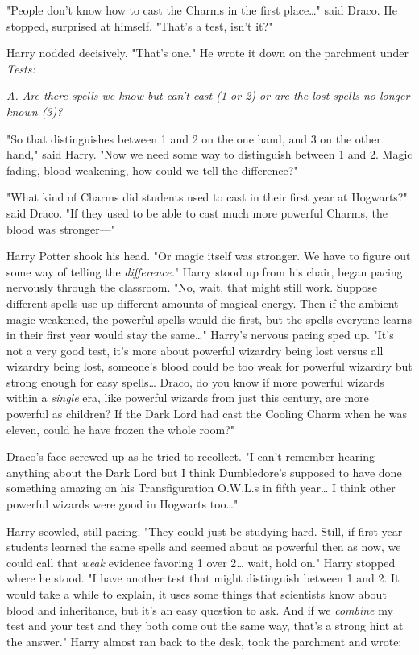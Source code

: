 "People don't know how to cast the Charms in the first place{\ldots}" said 
Draco. He stopped, surprised at himself. "That's a test, isn't it?"

Harry nodded decisively. "That's one." He wrote it down on the parchment under 
\emph{Tests:}

\emph{A. Are there spells we know but can't cast (1 or 2) or are the lost 
spells no longer known (3)?}

"So that distinguishes between 1 and 2 on the one hand, and 3 on the other 
hand," said Harry. "Now we need some way to distinguish between 1 and 2. Magic 
fading, blood weakening, how could we tell the difference?"

"What kind of Charms did students used to cast in their first year at 
Hogwarts?" said Draco. "If they used to be able to cast much more powerful 
Charms, the blood was stronger---"

Harry Potter shook his head. "Or magic itself was stronger. We have to figure 
out some way of telling the \emph{difference.}" Harry stood up from his chair, 
began pacing nervously through the classroom. "No, wait, that might still work. 
Suppose different spells use up different amounts of magical energy. Then if 
the ambient magic weakened, the powerful spells would die first, but the spells 
everyone learns in their first year would stay the same{\ldots}" Harry's 
nervous pacing sped up. "It's not a very good test, it's more about powerful 
wizardry being lost versus all wizardry being lost, someone's blood could be 
too weak for powerful wizardry but strong enough for easy spells{\ldots} Draco, 
do you know if more powerful wizards within a \emph{single} era, like powerful 
wizards from just this century, are more powerful as children? If the Dark Lord 
had cast the Cooling Charm when he was eleven, could he have frozen the whole 
room?"

Draco's face screwed up as he tried to recollect. "I can't remember hearing 
anything about the Dark Lord but I think Dumbledore's supposed to have done 
something amazing on his Transfiguration O.W.L.s in fifth year{\ldots} I think 
other powerful wizards were good in Hogwarts too{\ldots}"

Harry scowled, still pacing. "They could just be studying hard. Still, if 
first-year students learned the same spells and seemed about as powerful then 
as now, we could call that \emph{weak} evidence favoring 1 over 2{\ldots} wait, 
hold on." Harry stopped where he stood. "I have another test that might 
distinguish between 1 and 2. It would take a while to explain, it uses some 
things that scientists know about blood and inheritance, but it's an easy 
question to ask. And if we \emph{combine} my test and your test and they both 
come out the same way, that's a strong hint at the answer." Harry almost ran 
back to the desk, took the parchment and wrote:

